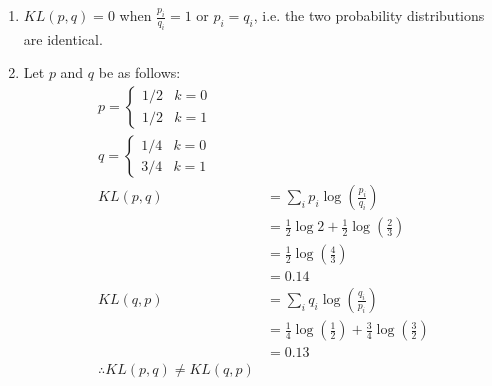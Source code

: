 \documentclass[11pt,english]{article}
\begin{document}
\begin{enumerate}
\begin{enumerate}[label=(\alph*)]
		\item $KL(p,q) = 0$ when $\frac{p_i}{q_i} = 1$ or $p_i = q_i$, i.e. the two probability distributions are identical.
		\newpage
		
		\item Let $p$ and $q$ be as follows:
		\begin{align*}
		p = 
		\begin{cases}
		1/2 & k = 0 \\
		1/2 & k = 1 
		\end{cases} \\
		q = 
		\begin{cases}
		1/4 & k = 0 \\
		3/4 & k = 1 
		\end{cases} \\
		KL(p,q) &= \sum_{i} p_i \log \left(\frac{p_i}{q_i}\right) \\
		&= \frac{1}{2}\log 2 + \frac{1}{2} \log \left(\frac{2}{3}\right) \\
		&= \frac{1}{2}\log \left(\frac{4}{3}\right) \\
		&= 0.14 \\
		KL(q,p) &= \sum_{i} q_i \log \left(\frac{q_i}{p_i}\right) \\
		&= \frac{1}{4}\log \left(\frac{1}{2}\right) + \frac{3}{4} \log \left(\frac{3}{2}\right) \\
		&= 0.13 \\
		\therefore KL(p,q) \neq KL(q,p)
		\end{align*}
	\end{enumerate} 
	\newpage
	

\end{enumerate}
\end{document}
